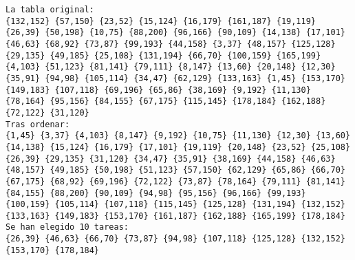 \documentclass[10pt,a4paper]{article}
\begin{document}
\begin{lstlisting}[breaklines]
La tabla original:
{132,152} {57,150} {23,52} {15,124} {16,179} {161,187} {19,119} {26,39} {50,198} {10,75} {88,200} {96,166} {90,109} {14,138} {17,101} {46,63} {68,92} {73,87} {99,193} {44,158} {3,37} {48,157} {125,128} {29,135} {49,185} {25,108} {131,194} {66,70} {100,159} {165,199} {4,103} {51,123} {81,141} {79,111} {8,147} {13,60} {20,148} {12,30} {35,91} {94,98} {105,114} {34,47} {62,129} {133,163} {1,45} {153,170} {149,183} {107,118} {69,196} {65,86} {38,169} {9,192} {11,130} {78,164} {95,156} {84,155} {67,175} {115,145} {178,184} {162,188} {72,122} {31,120}
Tras ordenar:
{1,45} {3,37} {4,103} {8,147} {9,192} {10,75} {11,130} {12,30} {13,60} {14,138} {15,124} {16,179} {17,101} {19,119} {20,148} {23,52} {25,108} {26,39} {29,135} {31,120} {34,47} {35,91} {38,169} {44,158} {46,63} {48,157} {49,185} {50,198} {51,123} {57,150} {62,129} {65,86} {66,70} {67,175} {68,92} {69,196} {72,122} {73,87} {78,164} {79,111} {81,141} {84,155} {88,200} {90,109} {94,98} {95,156} {96,166} {99,193} {100,159} {105,114} {107,118} {115,145} {125,128} {131,194} {132,152} {133,163} {149,183} {153,170} {161,187} {162,188} {165,199} {178,184}
Se han elegido 10 tareas:
{26,39} {46,63} {66,70} {73,87} {94,98} {107,118} {125,128} {132,152} {153,170} {178,184}
\end{lstlisting}
\end{document}

